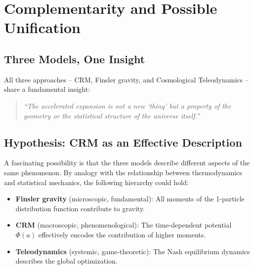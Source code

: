 \documentclass[aps,prd,twocolumn,superscriptaddress,nofootinbib]{revtex4-2}
\begin{document}
\section{Complementarity and Possible Unification}
\label{sec:complementarity}

\subsection{Three Models, One Insight}

All three approaches -- CRM, Finsler gravity, and Cosmological Teleodynamics -- share a fundamental insight:
\begin{quote}
\textit{``The accelerated expansion is not a new `thing' but a property of the geometry or the statistical structure of the universe itself.''}
\end{quote}

\subsection{Hypothesis: CRM as an Effective Description}

A fascinating possibility is that the three models describe different aspects of the same phenomenon. By analogy with the relationship between thermodynamics and statistical mechanics, the following hierarchy could hold:

\begin{itemize}
\item \textbf{Finsler gravity} (microscopic, fundamental): All moments of the 1-particle distribution function contribute to gravity.
\item \textbf{CRM} (macroscopic, phenomenological): The time-dependent potential $\Phi(a)$ effectively encodes the contribution of higher moments.
\item \textbf{Teleodynamics} (systemic, game-theoretic): The Nash equilibrium dynamics describes the global optimization.
\end{itemize}
\end{document}
